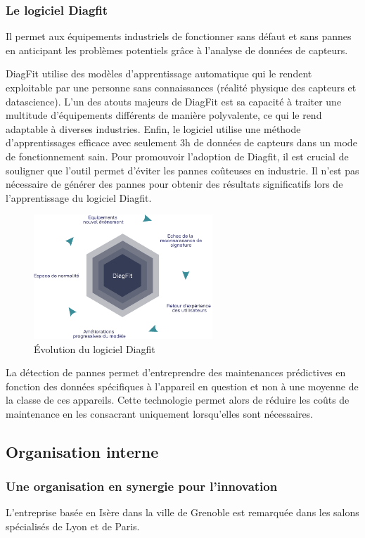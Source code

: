 \subsubsection{Le logiciel Diagfit}
Il permet aux équipements industriels de fonctionner sans défaut et sans pannes en anticipant les problèmes potentiels grâce à l'analyse de données de capteurs.

DiagFit utilise des modèles d'apprentissage automatique qui le rendent exploitable par une personne sans connaissances (réalité physique des capteurs et datascience).
L'un des atouts majeurs de DiagFit est sa capacité à traiter une multitude d'équipements différents de manière polyvalente, ce qui le rend adaptable à diverses industries.
Enfin, le logiciel utilise une méthode d'apprentissages efficace avec seulement 3h de données de capteurs dans un mode de fonctionnement sain.
Pour promouvoir l'adoption de Diagfit, il est crucial de souligner que l'outil permet d'éviter les pannes coûteuses en industrie.
Il n'est pas nécessaire de générer des pannes pour obtenir des résultats significatifs lors de l'apprentissage du logiciel Diagfit.

\begin{figure}[ht!]
    \centering
    \includegraphics[width=0.6\textwidth]{paper/figures/diagfit.pdf}
    \caption{Évolution du logiciel Diagfit}
    \label{fig:diagfit}
\end{figure}

La détection de pannes permet d'entreprendre des maintenances prédictives en fonction des données spécifiques à l'appareil en question et non à une moyenne de la classe de ces appareils.
Cette technologie permet alors de réduire les coûts de maintenance en les consacrant uniquement lorsqu'elles sont nécessaires.

\subsection{Organisation interne}
\subsubsection{Une organisation en synergie pour l'innovation}
L'entreprise basée en Isère dans la ville de Grenoble est remarquée dans les salons spécialisés de Lyon et de Paris.

